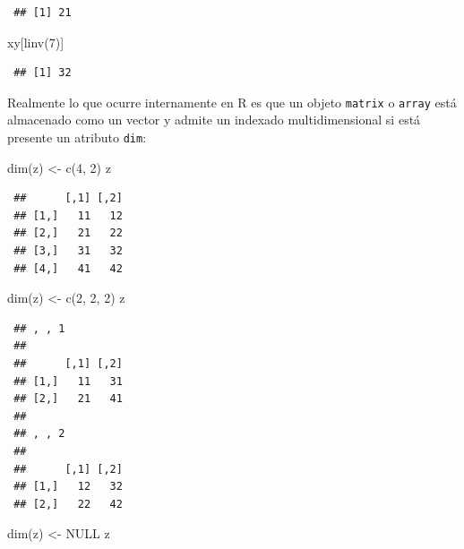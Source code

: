 \documentclass[
  10pt,
]{book}
\newenvironment{Shaded}{\begin{snugshade}}{\end{snugshade}}
\newcommand{\ConstantTok}[1]{\textcolor[rgb]{0.00,0.00,0.00}{#1}}
\newcommand{\DecValTok}[1]{\textcolor[rgb]{0.00,0.00,0.81}{#1}}
\newcommand{\FunctionTok}[1]{\textcolor[rgb]{0.00,0.00,0.00}{#1}}
\newcommand{\NormalTok}[1]{#1}
\newcommand{\OtherTok}[1]{\textcolor[rgb]{0.56,0.35,0.01}{#1}}
\theoremstyle{break}
\theoremstyle{nonumberplain}
\begin{document}
\begin{verbatim}
 ## [1] 21
\end{verbatim}

\begin{Shaded}
\begin{Highlighting}[]
\NormalTok{xy[}\FunctionTok{linv}\NormalTok{(}\DecValTok{7}\NormalTok{)]}
\end{Highlighting}
\end{Shaded}

\begin{verbatim}
 ## [1] 32
\end{verbatim}

Realmente lo que ocurre internamente en R es que un objeto \texttt{matrix} o \texttt{array} está almacenado como un vector y admite un indexado multidimensional si está presente un atributo \texttt{dim}:

\begin{Shaded}
\begin{Highlighting}[]
\FunctionTok{dim}\NormalTok{(z) }\OtherTok{\textless{}{-}} \FunctionTok{c}\NormalTok{(}\DecValTok{4}\NormalTok{, }\DecValTok{2}\NormalTok{)}
\NormalTok{z}
\end{Highlighting}
\end{Shaded}

\begin{verbatim}
 ##      [,1] [,2]
 ## [1,]   11   12
 ## [2,]   21   22
 ## [3,]   31   32
 ## [4,]   41   42
\end{verbatim}

\begin{Shaded}
\begin{Highlighting}[]
\FunctionTok{dim}\NormalTok{(z) }\OtherTok{\textless{}{-}} \FunctionTok{c}\NormalTok{(}\DecValTok{2}\NormalTok{, }\DecValTok{2}\NormalTok{, }\DecValTok{2}\NormalTok{)}
\NormalTok{z}
\end{Highlighting}
\end{Shaded}

\begin{verbatim}
 ## , , 1
 ## 
 ##      [,1] [,2]
 ## [1,]   11   31
 ## [2,]   21   41
 ## 
 ## , , 2
 ## 
 ##      [,1] [,2]
 ## [1,]   12   32
 ## [2,]   22   42
\end{verbatim}

\begin{Shaded}
\begin{Highlighting}[]
\FunctionTok{dim}\NormalTok{(z) }\OtherTok{\textless{}{-}} \ConstantTok{NULL}
\NormalTok{z}
\end{Highlighting}
\end{Shaded}
\end{document}
